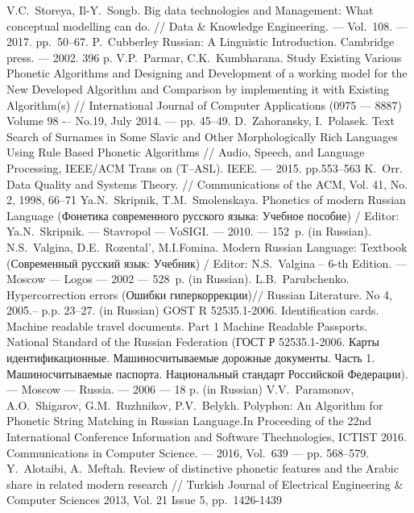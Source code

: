 \documentclass{svproc}
\begin{document}
\begin{thebibliography}{18}

 V.C.~Storeya, Il-Y.~Songb. Big data technologies and Management: What conceptual modelling can do. // Data \& Knowledge Engineering. --- Vol.~108. --- 2017. pp.~50--67.
 P.~Cubberley Russian: A Linguistic Introduction. Cambridge press. --– 2002. 396 p.
	V.P.~Parmar, C.K.~Kumbharana. Study Existing Various Phonetic Algorithms and Designing and Development of a working model for the New Developed Algorithm and Comparison by implementing it with Existing Algorithm(s) // International Journal of Computer Applications (0975 –-- 8887) Volume 98 -– No.19, July 2014. --– pp. 45--49.
 D.~Zahoransky, I.~Polasek. Text Search of Surnames in Some Slavic and Other Morphologically Rich Languages Using Rule Based Phonetic Algorithms // Audio, Speech, and Language Processing, IEEE/ACM Trans on (T--ASL). IEEE. --- 2015. pp.553--563
 K.~Orr. Data Quality and Systems Theory. // Communications of the ACM, Vol. 41, No. 2, 1998, 66--71
 Ya.N.~Skripnik, T.M.~Smolenskaya. Phonetics of modern Russian Language (Фонетика современного русского языка: Учебное пособие) / Editor: Ya.N.~Skripnik. --- Stavropol --- VoSIGI. --- 2010. --- 152~p. (in Russian).
 N.S.~Valgina, D.E.~Rozental', M.I.Fomina. Modern Russian Language: Textbook (Современный русский язык: Учебник) / Editor: N.S.~Valgina -- 6-th Edition. --- Moscow --- Logos --- 2002 --- 528~p. (in Russian).
 L.B.~Parubchenko. Hypercorrection errors (Ошибки гиперкоррекции)// Russian Literature. No 4, 2005.-- p.p. 23--27. (in Russian)
 GOST R 52535.1-2006. Identification cards. Machine readable travel documents. Part 1 Machine Readable Passports. National Standard of the Russian Federation (ГОСТ Р 52535.1-2006. Карты идентификационные. Машиносчитываемые дорожные документы. Часть 1. Машиносчитываемые паспорта. Национальный стандарт Российской Федерации). --- Moscow --- Russia. --- 2006 --- 18 p. (in Russian)
 V.V.~Paramonov, A.O.~Shigarov, G.M.~Ruzhnikov, P.V.~Belykh. Polyphon: An Algorithm for Phonetic String Matching in Russian Language.In Proceeding of the 22nd International Conference Information and Software Thechnologies, ICTIST 2016. Communications in Computer Science. --- 2016, Vol.~639 --- pp. 568--579.
 Y.~Alotaibi, A.~Meftah. Review of distinctive phonetic features and the Arabic share in related modern research // Turkish Journal of Electrical Engineering \& Computer Sciences 2013, Vol. 21 Issue 5, pp.~1426-1439

\end{thebibliography}
\end{document}
